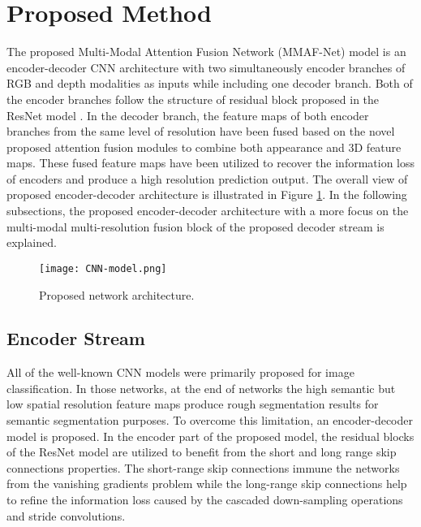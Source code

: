 \documentclass[journal,transmag]{IEEEtran}
\begin{document}
\section{Proposed Method}
\label{sec:3}
The proposed Multi-Modal Attention Fusion Network (MMAF-Net)  model is an encoder-decoder CNN architecture with two simultaneously encoder branches of RGB and depth modalities as inputs while including one decoder branch. Both of the encoder branches follow the structure of residual block proposed in the ResNet model \cite{he2016deep}. In the decoder branch, the feature maps of both encoder branches from the same level of resolution have been fused based on the novel proposed attention fusion modules to combine both appearance and 3D feature maps. These fused feature maps have been utilized to recover the information loss of encoders and produce a high resolution prediction output. The overall view of proposed encoder-decoder architecture is illustrated in Figure \ref{fig:CNN_model}. In the following subsections, the proposed encoder-decoder architecture with a more focus on the multi-modal multi-resolution fusion block of the proposed decoder stream is explained. 

\begin{figure}
	\begin{center}
		\texttt{[image: CNN-model.png]}
	\end{center}
	\caption{Proposed network architecture.}
	\label{fig:CNN_model}
\end{figure}

\subsection{Encoder Stream}

All of the well-known CNN models were primarily proposed for image classification. In those networks, at the end of networks the high semantic but low spatial resolution feature maps produce rough segmentation results for semantic segmentation purposes. To overcome this limitation, an encoder-decoder model is proposed. In the encoder part of the proposed model, the residual blocks of the ResNet model are utilized to benefit from the short and long range skip connections properties. The short-range skip connections immune the networks from the vanishing gradients problem while the long-range skip connections help to refine the information loss caused by the cascaded down-sampling operations and stride convolutions.
\end{document}
